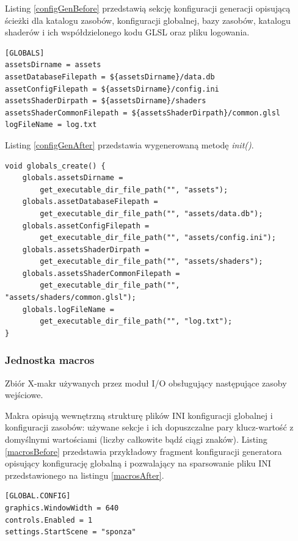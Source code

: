 Listing \ref{configGenBefore} przedstawią sekcję konfiguracji generacji opisującą ścieżki dla katalogu zasobów, konfiguracji globalnej, bazy zasobów, katalogu shaderów i ich współdzielonego kodu GLSL oraz pliku logowania.
\lstset{language=verbatim}
\begin{lstlisting}[caption={Konfiguracja generacji zmiennych},captionpos=b,label={configGenBefore}]
[GLOBALS]
assetsDirname = assets
assetDatabaseFilepath = ${assetsDirname}/data.db
assetConfigFilepath = ${assetsDirname}/config.ini
assetsShaderDirpath = ${assetsDirname}/shaders
assetsShaderCommonFilepath = ${assetsShaderDirpath}/common.glsl
logFileName = log.txt
\end{lstlisting}
Listing \ref{configGenAfter} przedstawia wygenerowaną metodę \textit{init()}.
\lstset{language=C}
\begin{lstlisting}[caption={Wynik generacji zmiennych},captionpos=b,label={configGenAfter}]
void globals_create() {
	globals.assetsDirname =
		get_executable_dir_file_path("", "assets");
	globals.assetDatabaseFilepath =
		get_executable_dir_file_path("", "assets/data.db");
	globals.assetConfigFilepath =
		get_executable_dir_file_path("", "assets/config.ini");
	globals.assetsShaderDirpath =
		get_executable_dir_file_path("", "assets/shaders");
	globals.assetsShaderCommonFilepath =
  		get_executable_dir_file_path("", "assets/shaders/common.glsl");
	globals.logFileName =
		get_executable_dir_file_path("", "log.txt");
}
\end{lstlisting}

\subsubsection{Jednostka macros}
Zbiór X-makr używanych przez moduł I/O obsługujący następujące zasoby wejściowe.

Makra opisują wewnętrzną strukturę plików INI konfiguracji globalnej i konfiguracji zasobów: używane sekcje i ich dopuszczalne pary klucz-wartość z domyślnymi wartościami (liczby całkowite bądź ciągi znaków).
Listing \ref{macrosBefore} przedstawia przykładowy fragment konfiguracji generatora opisujący konfigurację globalną i pozwalający na sparsowanie pliku INI przedstawionego na listingu \ref{macrosAfter}.
\lstset{language=verbatim}
\begin{lstlisting}[caption={Konfiguracja generacji konfiguracji globalnej},captionpos=b,label={macrosBefore}]
[GLOBAL.CONFIG]
graphics.WindowWidth = 640
controls.Enabled = 1
settings.StartScene = "sponza"
\end{lstlisting}

